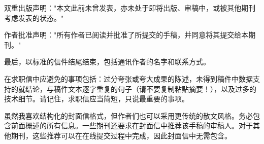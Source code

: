 双重出版声明："本文此前未曾发表，亦未处于即将出版、审稿中，或被其他期刊考虑发表的状态。"

作者批准声明："所有作者已阅读并批准了所提交的手稿，并同意将其提交给本期刊。"

最后，以标准的信件结尾结束，包括通讯作者的名字和联系方式。

在求职信中应避免的事项包括：过分夸张或夸大成果的陈述，未得到稿件中数据支持的就结论，与稿件文本逐字重复的句子（请不要复制粘贴摘要！），以及过多的技术细节。请记住，求职信应当简短，只说最重要的事项。

虽然我喜欢结构化的封面信格式，但作者们也可以采用更传统的散文风格。务必包含前面概述的所有信息。一些期刊还要求在封面信中推荐该手稿的审稿人。对于其他期刊，这些推荐可以在在线提交过程中完成，因此封面信中无需包含。

